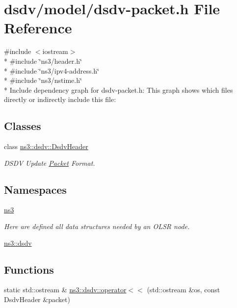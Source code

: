 \hypertarget{dsdv-packet_8h}{}\section{dsdv/model/dsdv-\/packet.h File Reference}
\label{dsdv-packet_8h}
{\ttfamily \#include $<$iostream$>$}\\*
{\ttfamily \#include \char`\"{}ns3/header.\+h\char`\"{}}\\*
{\ttfamily \#include \char`\"{}ns3/ipv4-\/address.\+h\char`\"{}}\\*
{\ttfamily \#include \char`\"{}ns3/nstime.\+h\char`\"{}}\\*
Include dependency graph for dsdv-\/packet.h\+:
This graph shows which files directly or indirectly include this file\+:
\subsection*{Classes}
\begin{DoxyCompactItemize}
\item 
class \hyperlink{classns3_1_1dsdv_1_1DsdvHeader}{ns3\+::dsdv\+::\+Dsdv\+Header}
\begin{DoxyCompactList}\small\item\em D\+S\+DV Update \hyperlink{classns3_1_1Packet}{Packet} Format. \end{DoxyCompactList}\end{DoxyCompactItemize}
\subsection*{Namespaces}
\begin{DoxyCompactItemize}
\item 
 \hyperlink{namespacens3}{ns3}
\begin{DoxyCompactList}\small\item\em Here are defined all data structures needed by an O\+L\+SR node. \end{DoxyCompactList}\item 
 \hyperlink{namespacens3_1_1dsdv}{ns3\+::dsdv}
\end{DoxyCompactItemize}
\subsection*{Functions}
\begin{DoxyCompactItemize}
\item 
static std\+::ostream \& \hyperlink{namespacens3_1_1dsdv_a24401288747c111b6394d728b020efe7}{ns3\+::dsdv\+::operator$<$$<$} (std\+::ostream \&os, const Dsdv\+Header \&packet)
\end{DoxyCompactItemize}
